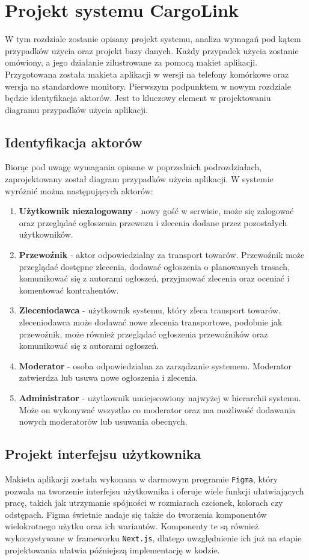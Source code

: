 \chapter{Projekt systemu CargoLink}
W tym rozdziale zostanie opisany projekt systemu, analiza wymagań pod kątem przypadków użycia oraz projekt bazy danych. Każdy przypadek użycia zostanie omówiony, a jego działanie zilustrowane za pomocą makiet aplikacji. Przygotowana została makieta aplikacji w wersji na telefony komórkowe oraz wersja na standardowe monitory. Pierwszym podpunktem w nowym rozdziale będzie identyfikacja aktorów. Jest to kluczowy element w projektowaniu diagramu przypadków użycia aplikacji.

\section{Identyfikacja aktorów}
Biorąc pod uwagę wymagania opisane w poprzednich podrozdziałach, zaprojektowany został diagram przypadków użycia aplikacji. W systemie wyróżnić można następujących aktorów:
\begin{enumerate}
\item \textbf{Użytkownik niezalogowany} - nowy gość w serwisie, może  się zalogować oraz przeglądać ogłoszenia przewozu i zlecenia dodane przez pozostałych użytkowników.
\item \textbf{Przewoźnik} - aktor odpowiedzialny za transport towarów. Przewoźnik może przeglądać dostępne zlecenia, dodawać ogłoszenia o planowanych trasach, komunikować się z autorami ogłoszeń, przyjmować zlecenia oraz oceniać i komentować kontrahentów.
\item \textbf{Zleceniodawca} - użytkownik systemu, który zleca transport towarów. zleceniodawca może dodawać nowe zlecenia transportowe, podobnie jak przewoźnik, może również przeglądać ogłoszenia przewoźników oraz komunikować się z autorami ogłoszeń.
\item \textbf{Moderator} - osoba odpowiedzialna za zarządzanie systemem. Moderator zatwierdza lub usuwa nowe ogłoszenia i zlecenia.
\item \textbf{Administrator} - użytkownik umiejscowiony najwyżej w hierarchii systemu. Może on wykonywać wszystko co moderator oraz ma możliwość dodawania nowych moderatorów lub usuwania obecnych.
\end{enumerate}

\section{Projekt interfejsu użytkownika}
Makieta aplikacji została wykonana w darmowym programie \texttt{Figma}, który pozwala na tworzenie interfejsu użytkownika i oferuje wiele funkcji ułatwiających pracę, takich jak utrzymanie spójności w rozmiarach czcionek, kolorach czy odstępach. Figma świetnie nadaje się także do tworzenia komponentów wielokrotnego użytku oraz ich wariantów. Komponenty te są również wykorzystywane w frameworku \texttt{Next.js}, dlatego uwzględnienie ich już na etapie projektowania ułatwia późniejszą implementację w kodzie.

